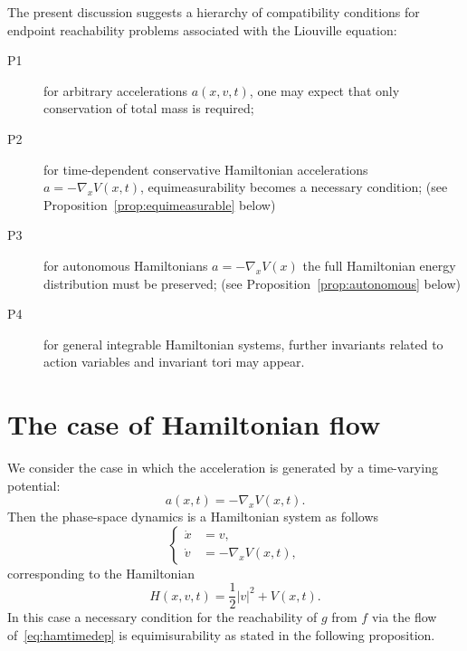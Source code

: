 \documentclass[11pt]{article}
\begin{document}
The present discussion suggests a hierarchy of compatibility conditions for
endpoint reachability problems associated with the Liouville equation:

\begin{description}

\item[P1] for arbitrary accelerations \(a(x,v,t)\), one may expect that only
conservation of total mass is required;

\item[P2] for time-dependent conservative Hamiltonian accelerations 
$a=-\nabla_x V(x,t)$, 
equimeasurability becomes a necessary condition; (see Proposition~\ref{prop:equimeasurable} below)

\item[P3] for autonomous Hamiltonians $a=-\nabla_x V(x)$ 
the full Hamiltonian energy distribution must be preserved; (see Proposition~\ref{prop:autonomous} below)

\item[P4] for general integrable Hamiltonian systems, further invariants related
to action variables and invariant tori may appear.  
\end{description}

%
\section{The case of Hamiltonian flow}


We consider the case in which the acceleration is
generated by a time-varying potential: 
\[
        a(x,t)=-\nabla_x V(x,t).
\]
Then the phase-space dynamics is a Hamiltonian system as follows 
\begin{equation}\label{eq:hamtimedep}
\begin{cases}
\dot x &=v,\\
\dot v &=-\nabla_x V(x,t),
\end{cases}
\end{equation}
corresponding to the Hamiltonian 
$$
H(x,v,t)=\frac12 |v|^2+V(x,t).
$$
In this case a necessary condition for the reachability of $g$ from $f$ via the flow of~\eqref{eq:hamtimedep} is equimisurability as stated in the following proposition.
\end{document}
